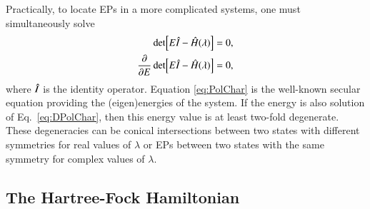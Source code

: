 \documentclass[aps,prb,reprint,noshowkeys,superscriptaddress]{revtex4-1}
\newcommand{\hI}{\Hat{I}}
\newcommand{\hH}{\Hat{H}}
\begin{document}
Practically, to locate EPs in a more complicated systems, one must simultaneously solve\cite{Cejnar_2007}
\begin{subequations}
\begin{align}
	\label{eq:PolChar}
	\det[E\hI-\hH(\lambda)] & = 0,
	\\ 
	\label{eq:DPolChar}
	\pdv{E}\det[E\hI-\hH(\lambda)] & = 0,
\end{align}
\end{subequations}
where $\hI$ is the identity operator.
Equation \eqref{eq:PolChar} is the well-known secular equation providing the (eigen)energies of the system. 
If the energy is also solution of Eq.~\eqref{eq:DPolChar}, then this energy value is at least two-fold degenerate. 
These degeneracies can be conical intersections between two states with different symmetries 
for real values of $\lambda$\cite{Yarkony_1996} or EPs between two states with the 
same symmetry for complex values of $\lambda$.


\subsection{The Hartree-Fock Hamiltonian}
\end{document}
